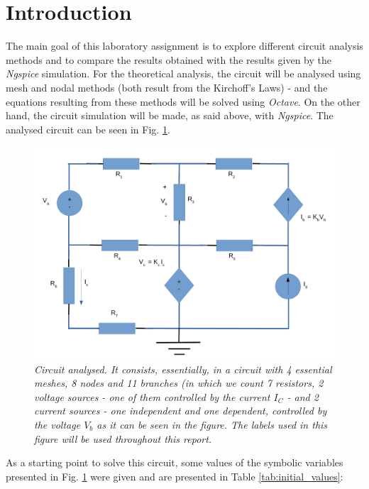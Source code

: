 \section{Introduction}
The main goal of this laboratory assignment is to explore different circuit analysis methods and to compare the results obtained with the results given by the \textit{Ngspice} simulation. For the theoretical analysis, the circuit will be analysed using mesh and nodal methods (both result from the Kirchoff's Laws) -  and the equations resulting from these methods will be solved using \textit{Octave}. On the other hand, the circuit simulation will be made, as said above, with \textit{Ngspice}. The analysed circuit can be seen in Fig. \ref{fig:esquema}.

\begin{figure}[h]
    \centering
    \includegraphics[width = 0.7\linewidth]{esquema.pdf}
        \caption{\textit{Circuit analysed. It consists, essentially, in a circuit with 4 essential meshes, 8 nodes and 11 branches (in which we count 7 resistors, 2 voltage sources - one of them controlled by the current $I_C$ - and 2 current sources - one independent and one dependent, controlled by the voltage $V_b$ as it can be seen in the figure. The labels used in this figure will be used throughout this report.}}
    \label{fig:esquema}
\end{figure}

As a starting point to solve this circuit, some values of the symbolic variables presented in Fig. \ref{fig:esquema} were given and are presented in Table \ref{tab:initial_values}:

